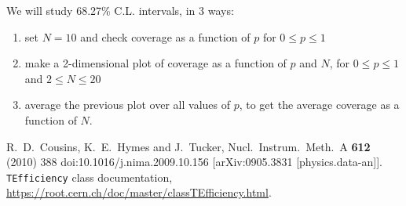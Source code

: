 \documentclass[a4paper,12pt]{article}
\begin{document}
 We will study 68.27\% C.L. intervals, in 3 ways:
 
 \begin{enumerate}
  \item set $N=10$ and check coverage as a function of $p$ for $0 \leq p \leq 1$
  \item make a 2-dimensional plot of coverage as a function of $p$ and $N$, for $0 \leq p \leq 1$ and $2 \leq N \leq 20$
  \item average the previous plot over all values of $p$, to get the average coverage as a function of $N$.
 \end{enumerate}

 \begin{thebibliography}{9}
  R.~D.~Cousins, K.~E.~Hymes and J.~Tucker,
  Nucl.\ Instrum.\ Meth.\ A {\bf 612} (2010) 388
  doi:10.1016/j.nima.2009.10.156
  [arXiv:0905.3831 [physics.data-an]].
   \texttt{TEfficiency} class documentation, \url{https://root.cern.ch/doc/master/classTEfficiency.html}.
 \end{thebibliography}
\end{document}
